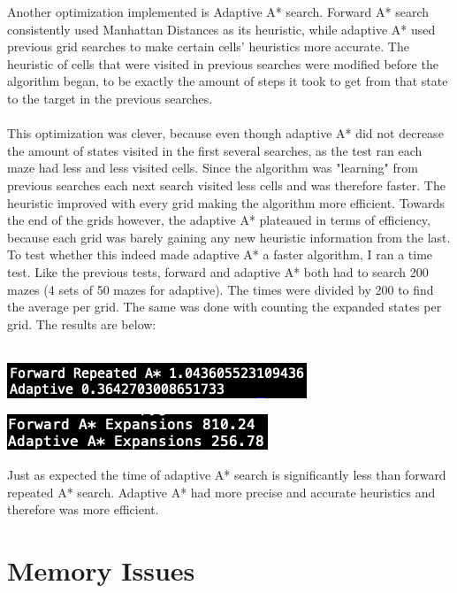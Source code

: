 \documentclass[12pt]{article}
\begin{document}
Another optimization implemented is Adaptive A* search. Forward A* search consistently used Manhattan Distances as its heuristic, while adaptive A* used previous grid searches to make certain cells' heuristics more accurate. The heuristic of cells that were visited in previous searches were modified before the algorithm began, to be exactly the amount of steps it took to get from that state to the target in the previous searches. \\
\\
This optimization was clever, because even though adaptive A* did not decrease the amount of states visited in the first several searches, as the test ran each maze had less and less visited cells. Since the algorithm was "learning" from previous searches each next search visited less cells and was therefore faster. The heuristic improved with every grid making the algorithm more efficient. Towards the end of the grids however, the adaptive A* plateaued in terms of efficiency, because each grid was barely gaining any new heuristic information from the last.  To test whether this indeed made adaptive A* a faster algorithm, I ran a time test. Like the previous tests, forward and adaptive A* both had to search 200 mazes (4 sets of 50 mazes for adaptive). The times were divided by 200 to find the average per grid. The same was done with counting the expanded states per grid. The results are below:\\
\\

\begin{center}
\includegraphics{adaptive.png}
\end{center}

\begin{center}
\includegraphics{adaptiveExp.png}
\end{center}
Just as expected the time of adaptive A* search is significantly less than forward repeated A* search. Adaptive A* had more precise and accurate heuristics and therefore was more efficient.

\section{Memory Issues}
\end{document}
